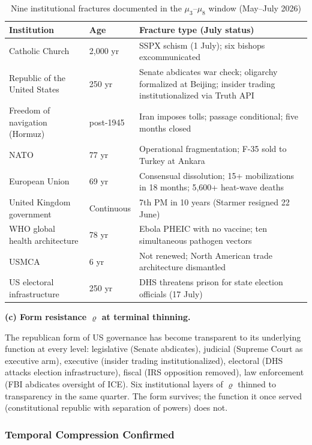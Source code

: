 \documentclass[12pt,a4paper]{article}
\begin{document}
\begin{table}[H]
\centering
\caption{Nine institutional fractures documented in the $\mu_3$--$\mu_8$ window (May--July 2026)}
\label{tab:nine_fractures}
\begin{tabularx}{\textwidth}{@{}llX@{}}
\toprule
\textbf{Institution} & \textbf{Age} & \textbf{Fracture type (July status)} \\
\midrule
Catholic Church & 2,000 yr & SSPX schism (1 July); six bishops excommunicated \\
Republic of the United States & 250 yr & Senate abdicates war check; oligarchy formalized at Beijing; insider trading institutionalized via Truth API \\
Freedom of navigation (Hormuz) & post-1945 & Iran imposes tolls; passage conditional; five months closed \\
NATO & 77 yr & Operational fragmentation; F-35 sold to Turkey at Ankara \\
European Union & 69 yr & Consensual dissolution; 15+ mobilizations in 18 months; 5,600+ heat-wave deaths \\
United Kingdom government & Continuous & 7th PM in 10 years (Starmer resigned 22 June) \\
WHO global health architecture & 78 yr & Ebola PHEIC with no vaccine; ten simultaneous pathogen vectors \\
USMCA & 6 yr & Not renewed; North American trade architecture dismantled \\
US electoral infrastructure & 250 yr & DHS threatens prison for state election officials (17 July) \\
\bottomrule
\end{tabularx}
\end{table}

\textbf{(c) Form resistance $\varrho$ at terminal thinning.}

The republican form of US governance has become transparent to its underlying function at every level: legislative (Senate abdicates), judicial (Supreme Court as executive arm), executive (insider trading institutionalized), electoral (DHS attacks election infrastructure), fiscal (IRS opposition removed), law enforcement (FBI abdicates oversight of ICE). Six institutional layers of $\varrho$ thinned to transparency in the same quarter. The form survives; the function it once served (constitutional republic with separation of powers) does not.

\subsubsection{Temporal Compression Confirmed}
\end{document}
